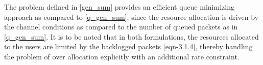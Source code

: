 The problem defined in \eqref{gen_sum} provides an efficient queue minimizing approach as compared to \eqref{q_gen_sum}, since the resource allocation is driven by the channel conditions as compared to the number of queued packets as in \eqref{q_gen_sum}. It is to be noted that in both formulations, the resources allocated to the users are limited by the backlogged packets \eqref{eqn-3.1.4}, thereby handling the problem of over allocation explicitly with an additional rate constraint.
